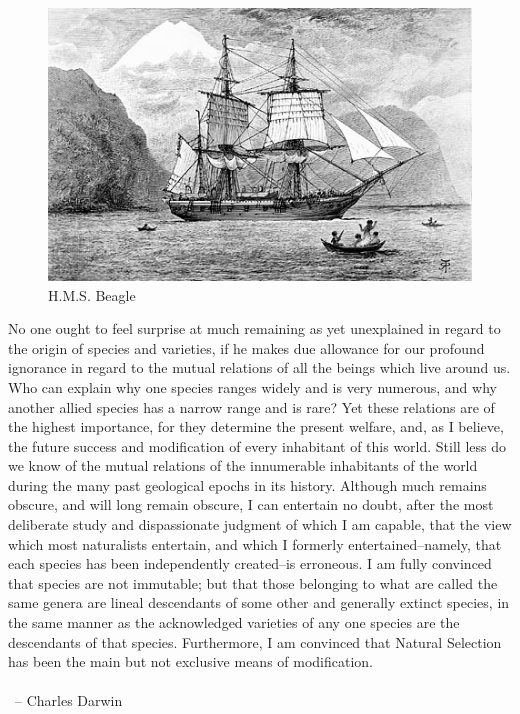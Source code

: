 \begin{figure}
\includegraphics[width=\linewidth]{Images/HMSBeagle.jpg}
\caption{H.M.S. Beagle}
\end{figure}

No one ought to feel surprise at much remaining as yet unexplained in regard to the origin of species and varieties, if he makes due allowance for our profound ignorance in regard to the mutual relations of all the beings which live around us. Who can explain why one species ranges widely and is very numerous, and why another allied species has a narrow range and is rare? Yet these relations are of the highest importance, for they determine the present welfare, and, as I believe, the future success and modification of every inhabitant of this world. Still less do we know of the mutual relations of the innumerable inhabitants of the world during the many past geological epochs in its history. Although much remains obscure, and will long remain obscure, I can entertain no doubt, after the most deliberate study and dispassionate judgment of which I am capable, that the view which most naturalists entertain, and which I formerly entertained--namely, that each species has been independently created--is erroneous. I am fully convinced that species are not immutable; but that those belonging to what are called the same genera are lineal descendants of some other and generally extinct species, in the same manner as the acknowledged varieties of any one species are the descendants of that species. Furthermore, I am convinced that Natural Selection has been the main but not exclusive means of modification.~\\ \\ \hspace*{0pt} ~\hfill  -- Charles Darwin